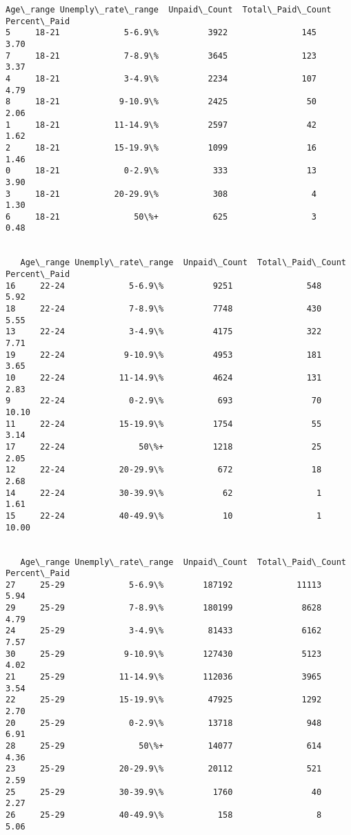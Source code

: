 \documentclass[11pt]{article}
\begin{document}
    \begin{Verbatim}[commandchars=\\\{\}]
  Age\_range Unemply\_rate\_range  Unpaid\_Count  Total\_Paid\_Count  Percent\_Paid
5     18-21             5-6.9\%          3922               145          3.70
7     18-21             7-8.9\%          3645               123          3.37
4     18-21             3-4.9\%          2234               107          4.79
8     18-21            9-10.9\%          2425                50          2.06
1     18-21           11-14.9\%          2597                42          1.62
2     18-21           15-19.9\%          1099                16          1.46
0     18-21             0-2.9\%           333                13          3.90
3     18-21           20-29.9\%           308                 4          1.30
6     18-21               50\%+           625                 3          0.48


   Age\_range Unemply\_rate\_range  Unpaid\_Count  Total\_Paid\_Count  Percent\_Paid
16     22-24             5-6.9\%          9251               548          5.92
18     22-24             7-8.9\%          7748               430          5.55
13     22-24             3-4.9\%          4175               322          7.71
19     22-24            9-10.9\%          4953               181          3.65
10     22-24           11-14.9\%          4624               131          2.83
9      22-24             0-2.9\%           693                70         10.10
11     22-24           15-19.9\%          1754                55          3.14
17     22-24               50\%+          1218                25          2.05
12     22-24           20-29.9\%           672                18          2.68
14     22-24           30-39.9\%            62                 1          1.61
15     22-24           40-49.9\%            10                 1         10.00


   Age\_range Unemply\_rate\_range  Unpaid\_Count  Total\_Paid\_Count  Percent\_Paid
27     25-29             5-6.9\%        187192             11113          5.94
29     25-29             7-8.9\%        180199              8628          4.79
24     25-29             3-4.9\%         81433              6162          7.57
30     25-29            9-10.9\%        127430              5123          4.02
21     25-29           11-14.9\%        112036              3965          3.54
22     25-29           15-19.9\%         47925              1292          2.70
20     25-29             0-2.9\%         13718               948          6.91
28     25-29               50\%+         14077               614          4.36
23     25-29           20-29.9\%         20112               521          2.59
25     25-29           30-39.9\%          1760                40          2.27
26     25-29           40-49.9\%           158                 8          5.06



\end{Verbatim}
\end{document}
